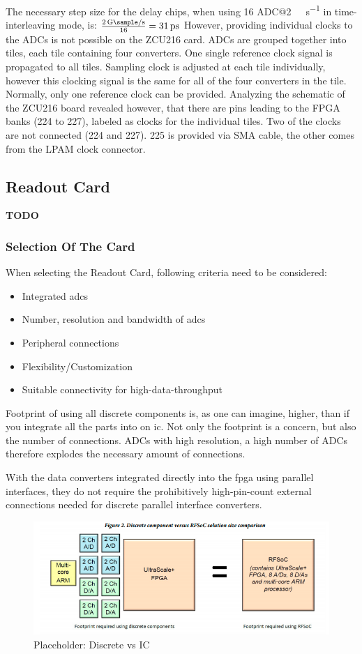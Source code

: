 The necessary step size for the delay chips, when using 16 ADC@\SI{2}{\giga \sample \per \second} in time-interleaving mode, is: $\frac{\SI{2}{\giga \sample \per \second}}{16} = \SI{31}{\pico \second}$
However, providing individual clocks to the ADCs is not possible on the ZCU216 card. 
ADCs are grouped together into tiles, each tile containing four converters. One single reference clock signal is propagated to all tiles. 
Sampling clock is adjusted at each tile individually, however this clocking signal is the same for all of the four converters in the tile. 
Normally, only one reference clock can be provided. 
Analyzing the schematic of the ZCU216 board revealed however, that there are pins leading to the FPGA banks (224 to 227), labeled as clocks for the individual tiles. 
Two of the clocks are not connected (224 and 227). 225 is provided via SMA cable, the other comes from the LPAM clock connector. 

\subsection*{Readout Card}
\textbf{TODO}
\subsubsection*{Selection Of The Card}\label{sec:selection}
When selecting the Readout Card, following criteria need to be considered:
\begin{itemize}
	\item Integrated \glspl{adc}
	\item Number, resolution and bandwidth of \glspl{adc}
	\item Peripheral connections
	\item Flexibility/Customization
	\item Suitable connectivity for high-data-throughput
\end{itemize}

Footprint of using all discrete components is, as one can imagine, higher, than if you integrate all the parts into on \gls{ic}. 
Not only the footprint is a concern, but also the number of connections. 
ADCs with high resolution, a high number of ADCs therefore explodes the necessary amount of connections. 

With the data converters integrated directly into the \gls{fpga} using parallel interfaces, they do not require the
prohibitively high-pin-count external connections needed for discrete parallel interface converters.
 
\begin{figure}[tbh]
	\centering
	\includegraphics[width = \textwidth]{chap/04-work/img/footprint}
	\caption{Placeholder: Discrete vs IC}
	\label{fig:footprint}
\end{figure}
